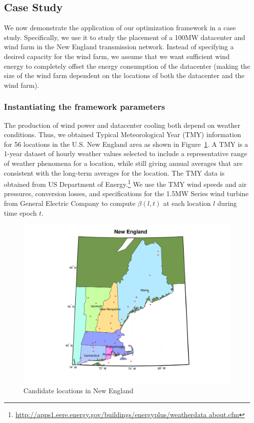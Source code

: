 \subsection{Case Study}
\label{sec:eval}

We now demonstrate the application of our optimization framework in a
case study.  Specifically, we use it to study the placement of a 100MW
datacenter and wind farm in the New England transmission network.
Instead of specifying a desired capacity for the wind farm, we assume
that we want sufficient wind energy to completely offset the energy
consumption of the datacenter (making the size of the wind farm
dependent on the locations of both the datacenter and the wind farm).

\subsubsection{Instantiating the framework parameters}

The production of wind power and datacenter cooling both depend on weather conditions.  Thus, we obtained Typical Meteorological Year (TMY) information for 56 locations in the U.S. New England area as shown in Figure~\ref{fig:NE_locs}.  A TMY is a 1-year dataset of hourly weather values selected to include a representative range of weather phenomena for a location, while still giving annual averages that are consistent with the long-term averages for the location.  The TMY data is obtained from US Department of Energy.\footnote{\url{http://apps1.eere.energy.gov/buildings/energyplus/weatherdata about.cfm}} We use the TMY wind speeds and air pressures, conversion losses, and specifications for the 1.5MW Series wind turbine from General Electric Company \cite{GE15MW} to compute $\beta(l,t)$ at each location $l$ during time epoch $t$.

\begin{figure}[ht]
\centering
\includegraphics[width=0.8\columnwidth]{img/NE_map}
\caption{Candidate locations in New England}
\label{fig:NE_locs}
\end{figure}

